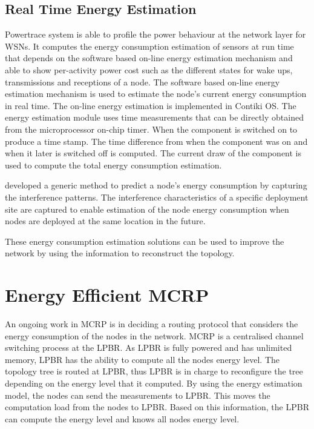 \subsection{Real Time Energy Estimation}
Powertrace system \cite{dunkels2011powertrace} is able to profile the power behaviour at the network layer for WSNs. It computes the energy consumption estimation of sensors at run time that depends on the software based on-line energy estimation mechanism \cite{dunkels2007software} and able to show per-activity power cost such as the different states for wake ups, transmissions and receptions of a node.
The software based on-line energy estimation mechanism is used to estimate the node's current energy consumption in real time. The on-line energy estimation is implemented in Contiki OS. The energy estimation module uses time measurements that can be directly obtained from the microprocessor on-chip timer. When the component is switched on to produce a time stamp. The time difference from when the component was on and when it later is switched off is computed. The current draw of the component is used to compute the total energy consumption estimation.


\cite{alexlifetime} developed a generic method to predict a node's energy consumption by capturing the interference patterns. The interference characteristics of a specific deployment site are captured to enable estimation of the node energy consumption when nodes are deployed at the same location in the future.

These energy consumption estimation solutions can be used to improve the network by using the information to reconstruct the topology.


\section{Energy Efficient MCRP}
An ongoing work in MCRP is in deciding a routing protocol that considers the energy consumption of the nodes in the network.
MCRP is a centralised channel switching process at the LPBR. As LPBR is fully powered and has unlimited memory, LPBR has the ability to compute all the nodes energy level. The topology tree is routed at LPBR, thus LPBR is in charge to reconfigure the tree depending on the energy level that it computed. By using the energy estimation model, the nodes can send the measurements to LPBR. This moves the computation load from the nodes to LPBR. Based on this information, the LPBR can compute the energy level and knows all nodes energy level.


